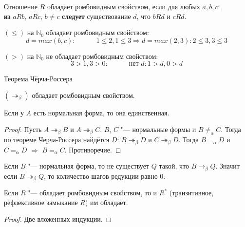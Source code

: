\documentclass[aspectratio=169]{beamer}
\begin{document}
\begin{frame}{}
\begin{dfn}
	Отношение $R$ обладает ромбовидным свойством, если для любых $a,b,c$:\\
{\bf из} $aRb$, $aRc$, $b\neq{}c$ {\bf следует} существование $d$, что $bRd$ и $cRd$.
\end{dfn}

\begin{exm}
	$(\leq)$ на $\mathbb{N}_0$ обладает ромбовидным свойством: $$d = max(b,c):\quad\quad\quad 1 \leq 2, 1 \leq 3 \Rightarrow d = max(2,3): 2 \leq 3, 3 \leq 3$$

	$(>)$ на $\mathbb{N}_0$ не обладает ромбовидным свойством: $$3 > 1, 3 > 0:\quad\quad\quad \text{нет } d: 1 > d, 0 > d$$
\end{exm}
\end{frame}

\begin{frame}{Теорема Чёрча-Россера}
\begin{thm}
	$(\twoheadrightarrow_{\beta})$ обладает ромбовидным свойством.
\end{thm}


\begin{cons}
	Если у $A$ есть нормальная форма, то она единственная.
\end{cons}

\begin{proof}
	Пусть $A\twoheadrightarrow_{\beta}B$ и $A\twoheadrightarrow_{\beta}C$. $B$, $C$ "--- нормальные формы и $B\neq_{\alpha}C$. 
	Тогда по теореме Черча-Россера найдётся $D$: $B\twoheadrightarrow_{\beta}D$ и $C\twoheadrightarrow_{\beta}D$. Тогда $B=_{\alpha}D$ и $C=_{\alpha} D$ $\Rightarrow$ $B=_{\alpha}C$. Противоречие.
\end{proof}

\begin{lmm}
	Если $B$ "--- нормальная форма, то не существует $Q$ такой, что $B\to_{\beta}Q$. Значит если $B\twoheadrightarrow_{\beta}Q$, то количество шагов редукции равно 0.
\end{lmm}
\end{frame}

\begin{frame}{}
\begin{lmm}
	 \label{refl}
	Если $R$ "--- обладает ромбовидным свойством, то и $R^{*}$ (транзитивное, рефлексивное замыкание $R$) им обладает.
\end{lmm}

\begin{proof}
Две вложенных индукции.
\end{proof}
\end{frame}
\end{document}
